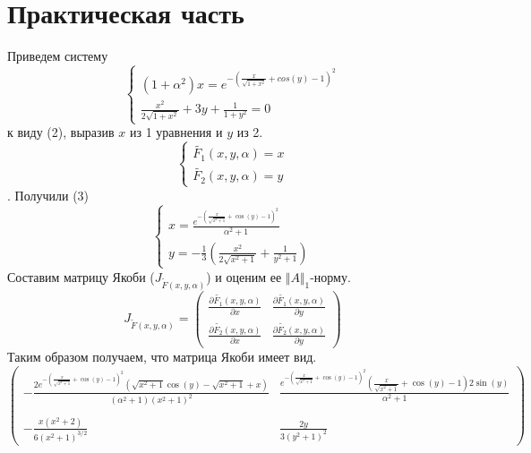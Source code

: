 \documentclass[a4paper, fontsize=14pt]{article}
\begin{document}
    \section{Практическая часть}
    Приведем систему
    \begin{equation}
            \begin{cases}
	        (1+\alpha^2)x = e^{-(\frac{x}{\sqrt{1+x^2}} + cos(y) -1)^2}\\
		\frac{x^2}{2\sqrt{1+x^2}} +3y + \frac{1}{1+y^2} = 0
		\end{cases}
	\end{equation}
    к виду (2), выразив $x$ из 1 уравнения и $y$ из 2.
            \begin{equation}
	    \begin{cases}
	        \widetilde{F_1}(x,y,\alpha) = x\\
		\widetilde{F_2}(x,y,\alpha) = y
		\end{cases}
	\end{equation}.
    Получили (3)
    \begin{equation}
            \begin{cases}
	        x=\frac{e^{-\left(\frac{x}{\sqrt{x^2+1}}+\cos(y) - 1\right)^2}}{\alpha^2 + 1}\\
		y=-\frac{1}{3}\left(\frac{x^2}{2\sqrt{x^2 + 1}} + \frac{1}{y^2 + 1}\right)
		\end{cases}
	\end{equation}
    Составим матрицу Якоби ($J_{\widetilde{F}(x,y,\alpha)}$) и оценим ее $\Vert A\Vert_1$-норму.
    $$J_{\widetilde{F}(x,y,\alpha)} =
      \begin{pmatrix}
          \frac{\partial\widetilde{F_1}(x,y,\alpha)}{\partial x} &\frac{\partial\widetilde{F_1}(x,y,\alpha)}{\partial y} \\
	  \frac{\partial\widetilde{F_2}(x,y,\alpha)}{\partial x} &\frac{\partial\widetilde{F_2}(x,y,\alpha)}{\partial y}
      \end{pmatrix}
    $$
    Таким образом получаем, что матрица Якоби имеет вид.
    $$%
      \begin{pmatrix}
          -\frac{2e^{-\left(\frac{x}{\sqrt{x^2+1}}+\cos (y)-1\right)^2} \left(\sqrt{x^2+1} \cos (y)-\sqrt{x^2+1}+x\right)}{\left(\alpha ^2+1\right) \left(x^2+1\right)^2}
	  &\frac{e^{-\left(\frac{x}{\sqrt{x^2+1}}+\cos (y)-1\right)^2} \left(\frac{x}{\sqrt{x^2+1}}+\cos (y)-1\right)2\sin(y)}{\alpha ^2+1}
	  \\\\
	  -\frac{x \left(x^2+2\right)}{6 \left(x^2+1\right)^{3/2}} &\frac{2 y}{3 \left(y^2+1\right)^2}
      \end{pmatrix}
    $$
\end{document}

